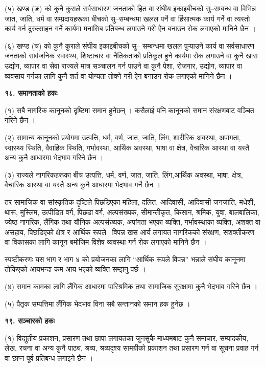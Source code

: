 (५) खण्ड (ङ) को कुनै कुराले सर्वसाधारण जनताको हित वा संघीय इकाइबीचको सु–सम्बन्ध वा विभिन्न जात, जाति, धर्म वा सम्प्रदायहरूका बीचको सु–सम्बन्धमा खलल पर्ने वा हिंसात्मक कार्य गर्ने वा त्यस्तो कार्य गर्न दुरुत्साहन गर्ने कार्यमा मनासिब प्रतिबन्ध लगाउने गरी ऐन बनाउन रोक लगाएको मानिने छैन ।

(६) खण्ड (च) को कुनै कुराले संघीय इकाइबीचको सु– सम्बन्धमा खलल पुर्‍याउने कार्य वा सर्वसाधारण जनताको सार्वजनिक स्वास्थ्य, शिष्टाचार वा नैतिकताको प्रतिकूल हुने कार्यमा रोक लगाउने वा कुनै खास उद्योग, व्यापार वा सेवा राज्यले मात्र सञ्चालन गर्न पाउने वा कुनै पेशा, रोजगार, उद्योग, व्यापार वा व्यवसाय गर्नका लागि कुनै शर्त वा योग्यता तोक्ने गरी ऐन बनाउन रोक लगाएको मानिने छैन ।

\textbf{१८. समानताको हकः}

(१) सबै नागरिक कानूनको दृष्टिमा समान हुनेछन् । कसैलाई पनि कानूनको समान संरक्षणबाट वञ्चित गरिने छैन ।

(२) सामान्य कानूनको प्रयोगमा उत्पत्ति, धर्म, वर्ण, जात, जाति, लिंग, शारीरिक अवस्था, अपांगता, स्वास्थ्य स्थिति, वैवाहिक स्थिति, गर्भावस्था, आर्थिक अवस्था, भाषा वा क्षेत्र, वैचारिक आस्था वा यस्तै अन्य कुनै आधारमा भेदभाव गरिने छैन ।

(३) राज्यले नागरिकहरूका बीच उत्पत्ति, धर्म, वर्ण, जात, जाति, लिंग,आर्थिक अवस्था, भाषा, क्षेत्र, वैचारिक आस्था वा यस्तै अन्य कुनै आधारमा भेदभाव गर्ने छैन ।

तर सामाजिक वा सांस्कृतिक दृष्टिले पिछडिएका महिला, दलित, आदिवासी, आदिवासी जनजाति, मधेशी, थारू, मुस्लिम, उत्पीडित वर्ग, पिछडा वर्ग, अल्पसंख्यक, सीमान्तीकृत, किसान, श्रमिक, युवा, बालबालिका, ज्येष्ठ नागरिक, लैंगिक तथा यौनिक अल्पसंख्यक, अपांगता भएका व्यक्ति, गर्भावस्थाका व्यक्ति, अशक्त वा असहाय, पिछडिएको क्षेत्र र आर्थिक रूपले  विपन्न खस आर्य लगायत नागरिकको संरक्षण, सशक्तीकरण वा विकासका लागि कानून बमोजिम विशेष व्यवस्था गर्न रोक लगाएको मानिने छैन ।

स्पष्टीकरणः यस भाग र भाग ४ को प्रयोजनका लागि “आर्थिक रूपले विपन्न” भन्नाले संघीय कानूनमा तोकिएको आयभन्दा कम आय भएको व्यक्ति सम्झनु पर्छ ।

(४) समान कामका लागि लैंगिक आधारमा पारिश्रमिक तथा सामाजिक सुरक्षामा कुनै भेदभाव गरिने छैन ।

(५) पैतृक सम्पत्तिमा लैंगिक भेदभाव विना सबै सन्तानको समान हक हुनेछ ।

\textbf{१९. सञ्चारको हकः}

(१) विद्युतीय प्रकाशन, प्रसारण तथा छापा लगायतका जुनसुकै माध्यमबाट कुनै समाचार, सम्पादकीय, लेख, रचना वा अन्य कुनै पाठ्य, श्रव्य, श्रव्यदृश्य सामग्रीको प्रकाशन तथा प्रसारण गर्न वा सूचना प्रवाह गर्न वा छाप्न पूर्व प्रतिबन्ध लगाइने छैन ।

